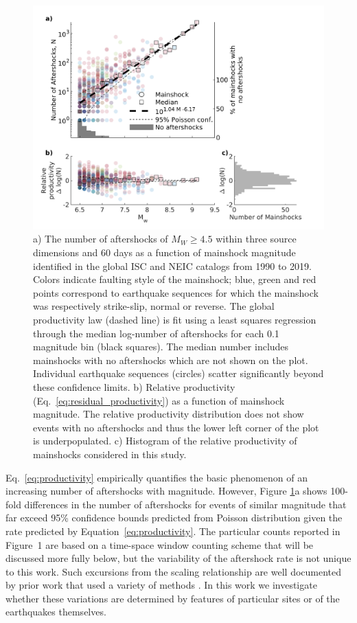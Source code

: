 \documentclass[draft, jgrga]{agujournal2018}
\begin{document}
    \begin{figure}
        \centering
        \includegraphics{figures/prod_law.png}
        \caption{a) The number of aftershocks of $M_W\ge4.5$ within three source dimensions and 60 days as a function of mainshock magnitude identified in the global ISC and NEIC catalogs from 1990 to 2019. Colors indicate faulting style of the mainshock; blue, green and red points correspond to earthquake sequences for which the mainshock was respectively strike-slip, normal or reverse. The global productivity law (dashed line) is fit using a least squares regression through the median log-number of aftershocks for each 0.1 magnitude bin (black squares). The median number includes mainshocks with no aftershocks which are not shown on the plot.  Individual earthquake sequences (circles) scatter significantly beyond these confidence limits. b) Relative productivity (Eq.~\ref{eq:residual_productivity}) as a function of mainshock magnitude. The relative productivity distribution does not show events with no aftershocks and thus the lower left corner of the plot is underpopulated. c) Histogram of the relative productivity of mainshocks considered in this study.
        }
        \label{fig:fms_prod}
    \end{figure}

Eq.~\ref{eq:productivity} empirically quantifies the basic phenomenon of an increasing number of aftershocks with magnitude. However, Figure \ref{fig:fms_prod}a shows 100-fold differences in the number of aftershocks for events of similar magnitude that far exceed 95\% confidence bounds predicted from Poisson distribution given the rate predicted by Equation~\ref{eq:productivity}. The particular counts reported in Figure~1 are based on a time-space window counting scheme that will be discussed more fully below, but the variability of the aftershock rate is not unique to this work. Such excursions from the scaling relationship are  well documented by prior work that used a variety of methods \citep[e.g.][]{Marsan2017HowAftershocks,Boettcher2004EarthquakeFaults,Page,Tahir2014Aftershock2005}. In this work we investigate whether these variations are determined by features of particular sites or of the earthquakes themselves.
\end{document}
